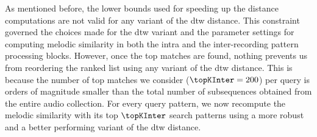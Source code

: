 As mentioned before, the lower bounds used for speeding up the distance computations are not valid for any variant of the \gls{dtw} distance. This constraint governed the choices made for the \gls{dtw} variant and the parameter settings for computing melodic similarity in both the intra and the inter-recording pattern processing blocks. However, once the top matches are found, nothing prevents us from reordering the ranked list using any variant of the \gls{dtw} distance. This is because the number of top matches we consider ($\topKInter=200$) per query is orders of magnitude smaller than the total number of subsequences obtained from the entire audio collection. For every query pattern, we now recompute the melodic similarity with its top $\topKInter$ search patterns using a more robust and a better performing variant of the \gls{dtw} distance.

